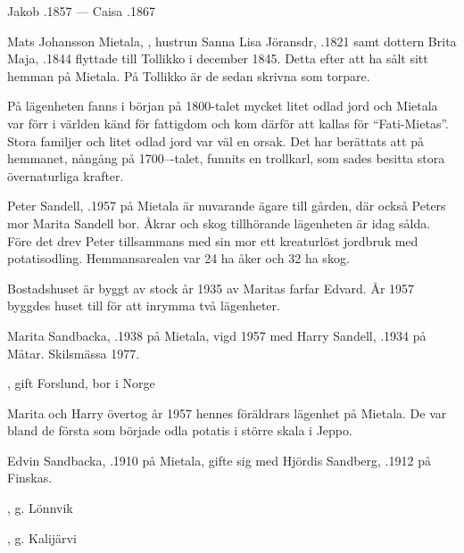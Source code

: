 Jakob .1857  ---  Caisa .1867


%
Mats Johansson Mietala, , hustrun Sanna Lisa Jöransdr, .1821 samt dottern Brita Maja,  .1844 flyttade till Tollikko i december 1845. Detta efter att ha sålt sitt hemman på Mietala. På Tollikko är de sedan skrivna som torpare.

På lägenheten fanns i början på 1800-talet mycket litet odlad jord och Mietala var förr i världen känd för fattigdom och kom därför att kallas för ``Fati-Mietas''. Stora familjer och litet odlad jord var väl en orsak. Det har berättats att på hemmanet, nångång på 1700---talet, funnits en trollkarl, som sades besitta stora övernaturliga krafter.



%



%
Peter Sandell, .1957 på Mietala är nuvarande ägare till gården, där också Peters mor Marita Sandell bor. Åkrar och skog tillhörande lägenheten är idag sålda. Före det drev Peter tillsammans med sin mor ett kreaturlöst jordbruk med potatisodling. Hemmansarealen var 24 ha åker och 32 ha skog.

Bostadshuset är byggt av stock år 1935 av Maritas farfar Edvard. År 1957 byggdes huset till för att inrymma två lägenheter.


%
Marita  Sandbacka, .1938 på Mietala, vigd 1957 med Harry Sandell, .1934 på Måtar. Skilsmässa 1977.
\begin{jhchildren}
  \item {}
  \item {}, gift Forslund, bor i Norge
\end{jhchildren}
Marita och Harry övertog år 1957 hennes föräldrars lägenhet på Mietala. De var bland de första som började odla potatis i större skala i Jeppo.


%
Edvin Sandbacka, .1910 på Mietala, gifte sig med Hjördis Sandberg, .1912 på Finskas.
\begin{jhchildren}
  \item {}, g. Lönnvik
  \item {}
  \item {}, g. Kalijärvi
\end{jhchildren}

